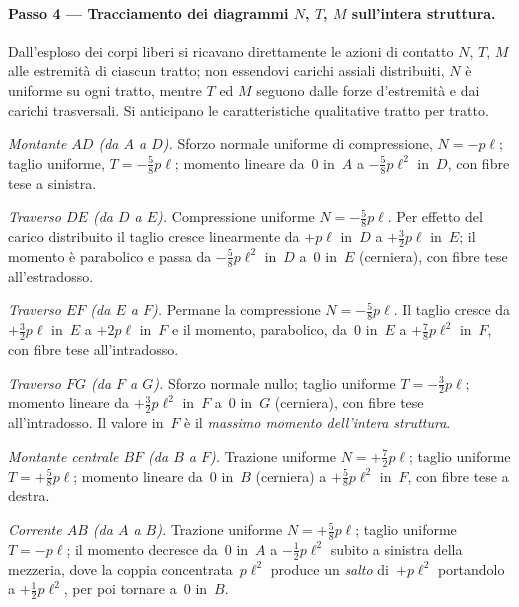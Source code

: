 \paragraph{Passo 4 --- Tracciamento dei diagrammi
	$N$, $T$, $M$ sull'intera struttura.}

Dall'esploso dei corpi liberi si ricavano direttamente le
azioni di contatto $N$, $T$, $M$ alle estremità di ciascun
tratto; non essendovi carichi assiali distribuiti, $N$ è
uniforme su ogni tratto, mentre $T$ ed $M$ seguono dalle
forze d'estremità e dai carichi trasversali. Si anticipano
le caratteristiche qualitative tratto per tratto.

\medskip
\noindent\textit{Montante $AD$ (da $A$ a $D$).}
Sforzo normale uniforme di compressione, $N = -p\ell$;
taglio uniforme, $T = -\tfrac58 p\ell$; momento lineare
da~$0$ in~$A$ a $-\tfrac58 p\ell^2$ in~$D$, con fibre tese
a sinistra.

\medskip
\noindent\textit{Traverso $DE$ (da $D$ a $E$).}
Compressione uniforme $N = -\tfrac58 p\ell$. Per effetto del
carico distribuito il taglio cresce linearmente da $+p\ell$
in~$D$ a $+\tfrac32 p\ell$ in~$E$; il momento è parabolico
e passa da $-\tfrac58 p\ell^2$ in~$D$ a~$0$ in~$E$ (cerniera),
con fibre tese all'estradosso.

\medskip
\noindent\textit{Traverso $EF$ (da $E$ a $F$).}
Permane la compressione $N = -\tfrac58 p\ell$. Il taglio
cresce da $+\tfrac32 p\ell$ in~$E$ a $+2p\ell$ in~$F$ e il
momento, parabolico, da~$0$ in~$E$ a $+\tfrac78 p\ell^2$
in~$F$, con fibre tese all'intradosso.

\medskip
\noindent\textit{Traverso $FG$ (da $F$ a $G$).}
Sforzo normale nullo; taglio uniforme $T = -\tfrac32 p\ell$;
momento lineare da $+\tfrac32 p\ell^2$ in~$F$ a~$0$ in~$G$
(cerniera), con fibre tese all'intradosso. Il valore in~$F$
è il \emph{massimo momento dell'intera struttura}.

\medskip
\noindent\textit{Montante centrale $BF$ (da $B$ a $F$).}
Trazione uniforme $N = +\tfrac72 p\ell$; taglio uniforme
$T = +\tfrac58 p\ell$; momento lineare da~$0$ in~$B$
(cerniera) a $+\tfrac58 p\ell^2$ in~$F$, con fibre tese
a destra.

\medskip
\noindent\textit{Corrente $AB$ (da $A$ a $B$).}
Trazione uniforme $N = +\tfrac58 p\ell$; taglio uniforme
$T = -p\ell$; il momento decresce da~$0$ in~$A$ a
$-\tfrac12 p\ell^2$ subito a sinistra della mezzeria, dove
la coppia concentrata~$p\ell^2$ produce un \emph{salto}
di~$+p\ell^2$ portandolo a $+\tfrac12 p\ell^2$, per poi
tornare a~$0$ in~$B$.

